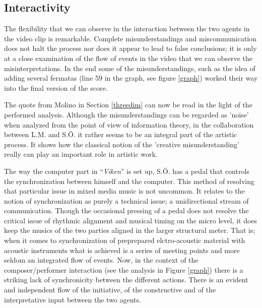 \documentclass[10pt,letterpaper]{article}
\begin{document}
\subsection{Interactivity}

The flexibility that we can observe in the interaction between the two
agents in the video clip is remarkable. Complete misunderstandings and
miscommunication does not halt the process nor does it appear to lead to
false conclusions; it is only at a close examination of the flow of
events in the video that we can observe the misinterpretations. In the
end some of the misunderstandings, such as the idea of adding several
fermatas (line 59 in the graph, see figure \ref{graph}) worked their way
into the final version of the score.

The quote from Molino in Section \ref{threedim} can now be read in the
light of the performed analysis.  Although the misunderstandings can be
regarded as 'noise' when analyzed from the point of view of information
theory, in the collaboration between L.M. and S.{\"O}. it rather seems to
be an integral part of the artistic process. It shows how the classical
notion of the 'creative misunderstanding' really can play an important
role in artistic work.

The way the computer part in ``\emph{Viken}'' is set up, S.{\"O}. has
a pedal that controls the synchronization between himself and the
computer. This method of resolving that particular issue in mixed media
music is not uncommon. It relates to the notion of synchronization as
purely a technical issue; a unidirectional stream of
communication. Though the occasional pressing of a pedal does not
resolve the critical issue of rhythmic alignment and musical timing on
the micro level, it does keep the musics of the two parties aligned in
the larger structural meter. That is; when it comes to synchronization of
preprepared elctro-acoustic material with acoustic instruments what is
achieved is a series of meeting points and more seldom an integrated
flow of events.
Now, in the context of the composer/performer interaction (see the
analysis in Figure \ref{graph}) there is a striking lack of
synchronicity between the different actions. There is an evident and
independent flow of the initiative, of the constructive and of the
interpretative input between the two agents.
\end{document}
